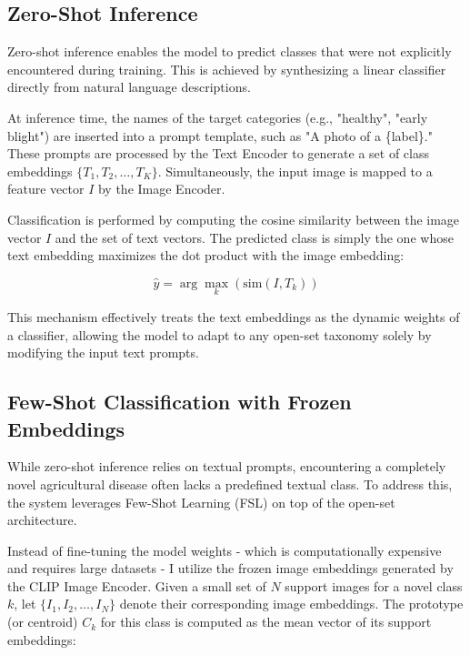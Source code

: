 \subsection{Zero-Shot Inference}

Zero-shot inference enables the model to predict classes that were not explicitly encountered during training. This is achieved by synthesizing a linear classifier directly from natural language descriptions.

At inference time, the names of the target categories (e.g., "healthy", "early blight") are inserted into a prompt template, such as "A photo of a \{label\}." These prompts are processed by the Text Encoder to generate a set of class embeddings $\{T_1, T_2, \dots, T_K\}$. Simultaneously, the input image is mapped to a feature vector $I$ by the Image Encoder.

Classification is performed by computing the cosine similarity between the image vector $I$ and the set of text vectors. The predicted class is simply the one whose text embedding maximizes the dot product with the image embedding:

\begin{equation}
	\hat{y} = \arg\max_{k} (\text{sim}(I, T_k))
\end{equation}

This mechanism effectively treats the text embeddings as the dynamic weights of a classifier, allowing the model to adapt to any open-set taxonomy solely by modifying the input text prompts.

\subsection{Few-Shot Classification with Frozen Embeddings}
While zero-shot inference relies on textual prompts, encountering a completely novel agricultural disease often lacks a predefined textual class. To address this, the system leverages Few-Shot Learning (FSL) on top of the open-set architecture.

Instead of fine-tuning the model weights - which is computationally expensive and requires large datasets - I utilize the frozen image embeddings generated by the CLIP Image Encoder. Given a small set of $N$ support images for a novel class $k$, let $\{I_1, I_2, \dots, I_N\}$ denote their corresponding image embeddings. The prototype (or centroid) $C_k$ for this class is computed as the mean vector of its support embeddings:

